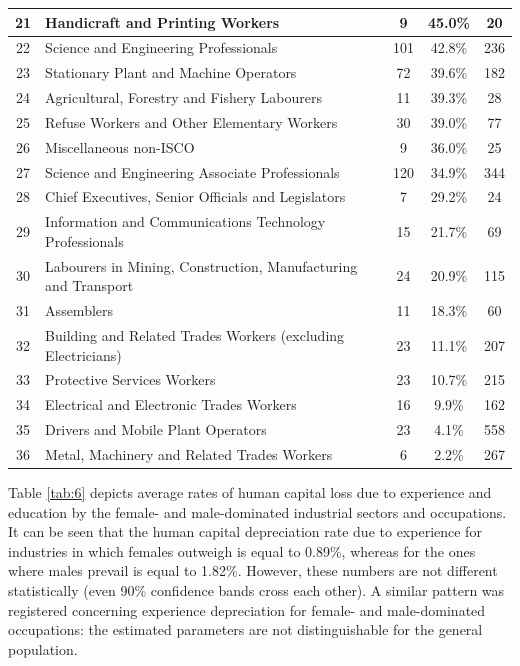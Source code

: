 \documentclass[12pt,a4paper]{article}
\numberwithin{equation}{section}
\begin{document}
\begin{table}[!ht]
\begin{small}
\begin{tabular}{cp{10cm}ccc}
				21 & Handicraft and Printing Workers & 9 & 45.0\% &  20 \\ \hline
				22 & Science and Engineering Professionals & 101 & 42.8\% & 236 \\ 
				23 & Stationary Plant and Machine Operators & 72 & 39.6\% & 182 \\ 
				24 & Agricultural, Forestry and Fishery Labourers & 11 & 39.3\% &  28 \\ 
				25 & Refuse Workers and Other Elementary Workers & 30 & 39.0\% &  77 \\ 
				26 & Miscellaneous non-ISCO & 9 & 36.0\% &  25 \\ 
				27 & Science and Engineering Associate Professionals & 120 & 34.9\% & 344 \\ 
				28 & Chief Executives, Senior Officials and Legislators & 7 & 29.2\% &  24 \\ 
				29 & Information and Communications Technology Professionals & 15 & 21.7\% &  69 \\ 
				30 & Labourers in Mining, Construction, Manufacturing and Transport & 24 & 20.9\% & 115 \\ 
				31 & Assemblers & 11 & 18.3\% &  60 \\ 
				32 & Building and Related Trades Workers (excluding Electricians) & 23 & 11.1\% & 207 \\ 
				33 & Protective Services Workers & 23 & 10.7\% & 215 \\ 
				34 & Electrical and Electronic Trades Workers & 16 & 9.9\% & 162 \\ 
				35 & Drivers and Mobile Plant Operators & 23 & 4.1\% & 558 \\ 
				36 & Metal, Machinery and Related Trades Workers & 6 & 2.2\% & 267 \\ 
				\hline
			\end{tabular}
		\end{small}
	\end{table}

Table \ref{tab:6} depicts average rates of human capital loss due to experience and education by the female- and male-dominated industrial sectors and occupations. It can be seen that the human capital depreciation rate due to experience for industries in which females outweigh is equal to 0.89\%, whereas for the ones where males prevail is equal to 1.82\%. However, these numbers are not different statistically (even 90\% confidence bands cross each other). A similar pattern was registered concerning experience depreciation for female- and male-dominated occupations: the estimated parameters are not distinguishable for the general population. 
\end{document}
